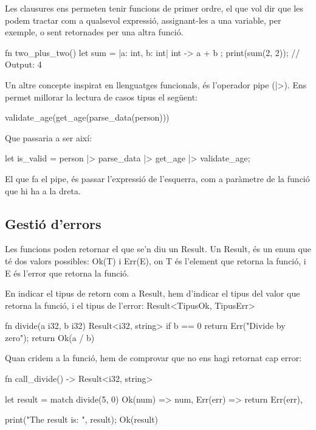 ﻿\documentclass{article}
\begin{document}
Les clausures ens permeten tenir funcions de primer ordre, el que vol dir que
les podem tractar com a qualsevol expressió, assignant-les a una variable, per 
exemple, o sent retornades per una altra funció.

\begin{code}
fn two_plus_two() {
    let sum = |a: int, b: int| int -> {
        a + b
    };
    print(sum(2, 2)); // Output: 4
}
\end{code}

Un altre concepte inspirat en llenguatges funcionals, és l'operador pipe (|>). 
Ens permet millorar la lectura de casos tipus el següent:

\begin{code}
validate_age(get_age(parse_data(person)))
\end{code}

Que passaria a ser així:

\begin{code}
let is_valid = 
    person
    |> parse_data
    |> get_age
    |> validate_age;
\end{code}

El que fa el pipe, és passar l'expressió de l'esquerra, com a paràmetre de la
funció que hi ha a la dreta.

\subsection{Gestió d'errors}

Les funcions poden retornar el que se'n diu un Result. Un Result, és un enum
que té dos valors possibles: {\ttfamily Ok(T) i Err(E)}, on T és l'element que retorna la
funció, i E és l'error que retorna la funció.

En indicar el tipus de retorn com a Result, hem d'indicar el tipus del valor que
retorna la funció, i el tipus de l'error: {\ttfamily Result<TipusOk, TipusErr> }

\begin{code}
fn divide(a i32, b i32) Result<i32, string> {
    if b == 0 {
        return Err("Divide by zero");
    }
    return Ok(a / b)
}
\end{code}

Quan cridem a la funció, hem de comprovar que no ens hagi retornat cap error:

\begin{code}
fn call_divide() -> Result<i32, string> {
    let result = match divide(5, 0) {
        Ok(num) => num,
        Err(err) => return Err(err),
    }

    print("The result is: ", result);
    Ok(result)
}
\end{code}
\end{document}
